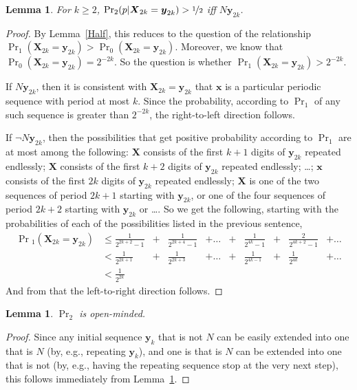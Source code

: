 \documentclass{ergoclass}
\newtheorem{lemma}[theorem]{Lemma}
\newcommand{\vx}{\boldsymbol{x}}
\newcommand{\vX}{\boldsymbol{X}}
\newcommand{\vy}{\boldsymbol{y}}
\begin{document}
\begin{lemma}
\label{DoubleSequence}
For $k \geq 2$, $\Pr_2(p | \vX_{2k} = \vy_{2k}) > \nicefrac{1}{2}$ iff $N\vy_{2k}$.
\end{lemma}
\begin{proof}
By Lemma~\ref{Half}, this reduces to the question of the relationship $\Pr_1(\vX_{2k} = \vy_{2k}) > \Pr_0(\vX_{2k} = \vy_{2k})$. Moreover, we know that $\Pr_0(\vX_{2k} = \vy_{2k}) = 2^{-2k}$. So the question is whether $\Pr_1(\vX_{2k} = \vy_{2k}) > 2^{-2k}$. 

If $N\vy_{2k}$, then it is consistent with $\vX_{2k} = \vy_{2k}$ that $\vx$ is a particular periodic sequence with period at most $k$. Since the probability, according to $\Pr_1$ of any such sequence is greater than $2^{-2k}$, the right-to-left direction follows.

If $\neg N\vy_{2k}$, then the possibilities that get positive probability according to $\Pr_1$ are at most among the following: $\vX$ consists of the first $k + 1$ digits of $\vy_{2k}$ repeated endlessly; $\vX$ consists of the first $k + 2$ digits of $\vy_{2k}$ repeated endlessly; \dots; $\vx$ consists of the first $2k$ digits of $\vy_{2k}$ repeated endlessly; $\vX$ is one of the two sequences of period $2k + 1$ starting with $\vy_{2k}$, or one of the four sequences of period $2k+2$ starting with $\vy_{2k}$ or \dots. So we get the following, starting with the probabilities of each of the possibilities listed in the previous sentence,
%
\begin{align*}
\Pr{}_1(\vX_{2k} = \vy_{2k}) 
	&\leq \frac{1}{2^{2k+2}-1} 
	&+ &\frac{1}{2^{2k+4}-1} 
	&+ \dots 
	&+ &\frac{1}{2^{4k}-1} 
	&+ &\frac{2}{2^{4k+2}-1} 
	&+ \dots \\
%
	&< \frac{1}{2^{2k+1}} 
	&+ &\frac{1}{2^{2k+3}} 
	&+ \dots
	&+ &\frac{1}{2^{4k-1}}
	&+ &\frac{1}{2^{4k}}
	&+ \dots \\
%
	&< \frac{1}{2^{2k}}
\end{align*}
%
And from that the left-to-right direction follows.
\end{proof}
%
%
\begin{lemma}
\label{Open}
$\Pr_2$ is open-minded.
\end{lemma}
\begin{proof}
Since any initial sequence $\vy_k$ that is not $N$ can be easily extended into one that is $N$ (by, e.g., repeating $\vy_k$), and one is that is $N$ can be extended into one that is not (by, e.g., having the repeating sequence stop at the very next step), this follows immediately from Lemma~\ref{DoubleSequence}.
\end{proof}
\end{document}
